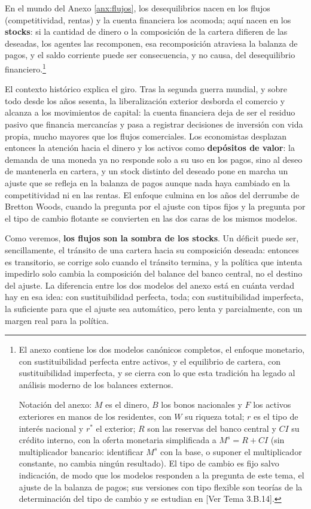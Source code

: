 \documentclass[10pt,a4paper]{article}
\newcommand{\authorfont}[1]{{\fontfamily{EBGaramond-TLF}\selectfont #1}}
\newcounter{anexo}
\begin{document}
En el mundo del Anexo \ref{anx:flujos}, los desequilibrios nacen en los flujos (competitividad, rentas) y la cuenta financiera los acomoda; aquí nacen en los \textbf{stocks}: si la cantidad de dinero o la composición de la cartera difieren de las deseadas, los agentes las recomponen, esa recomposición atraviesa la balanza de pagos, y el saldo corriente puede ser consecuencia, y no causa, del desequilibrio financiero.\footnote{%
    El anexo contiene los dos modelos canónicos completos, el enfoque monetario, con sustituibilidad perfecta entre activos, y el equilibrio de cartera, con sustituibilidad imperfecta, y se cierra con lo que esta tradición ha legado al análisis moderno de los balances externos.
    
    Notación del anexo: $M$ es el dinero, $B$ los bonos nacionales y $F$ los activos exteriores en manos de los residentes, con $W$ su riqueza total; $r$ es el tipo de interés nacional y $r^{*}$ el exterior; $R$ son las reservas del banco central y $CI$ su crédito interno, con la oferta monetaria simplificada a $M^{s}=R+CI$ (sin multiplicador bancario: identificar $M^{s}$ con la base, o suponer el multiplicador constante, no cambia ningún resultado). El tipo de cambio es fijo salvo indicación, de modo que los modelos responden a la pregunta de este tema, el ajuste de la balanza de pagos; sus versiones con tipo flexible son teorías de la determinación del tipo de cambio y se estudian en [\authorfont{Ver Tema 3.B.14}].
}

El contexto histórico explica el giro. Tras la segunda guerra mundial, y sobre todo desde los años sesenta, la liberalización exterior desborda el comercio y alcanza a los movimientos de capital: la cuenta financiera deja de ser el residuo pasivo que financia mercancías y pasa a registrar decisiones de inversión con vida propia, mucho mayores que los flujos comerciales. Los economistas desplazan entonces la atención hacia el dinero y los activos como \textbf{depósitos de valor}: la demanda de una moneda ya no responde solo a su uso en los pagos, sino al deseo de mantenerla en cartera, y un stock distinto del deseado pone en marcha un ajuste que se refleja en la balanza de pagos aunque nada haya cambiado en la competitividad ni en las rentas. El enfoque culmina en los años del derrumbe de Bretton Woods, cuando la pregunta por el ajuste con tipos fijos y la pregunta por el tipo de cambio flotante se convierten en las dos caras de los mismos modelos.

Como veremos, \textbf{los flujos son la sombra de los stocks}. Un déficit puede ser, sencillamente, el tránsito de una cartera hacia su composición deseada: entonces es transitorio, se corrige solo cuando el tránsito termina, y la política que intenta impedirlo solo cambia la composición del balance del banco central, no el destino del ajuste. La diferencia entre los dos modelos del anexo está en cuánta verdad hay en esa idea: con sustituibilidad perfecta, toda; con sustituibilidad imperfecta, la suficiente para que el ajuste sea automático, pero lenta y parcialmente, con un margen real para la política.
\end{document}
